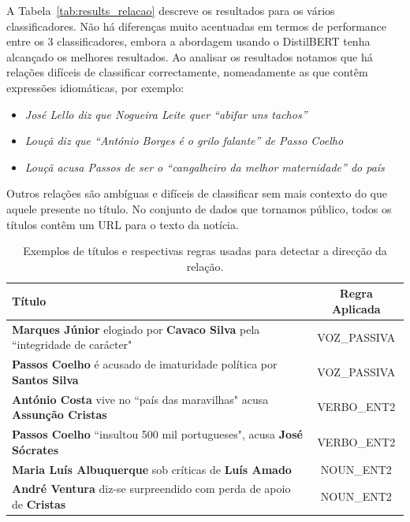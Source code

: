 \documentclass[a4paper, twocolumn, 11pt, twoside]{article}
\begin{document}
A Tabela~\ref{tab:results_relacao} descreve os resultados para os vários classificadores. Não há diferenças muito acentuadas em termos de performance entre os 3 classificadores, embora a abordagem usando o DistilBERT tenha alcançado os melhores resultados. Ao analisar os resultados notamos que há relações difíceis de classificar correctamente, nomeadamente as que contêm expressões idiomáticas, por exemplo:

\begin{itemize}
\item{\textit{José Lello diz que Nogueira Leite quer “abifar uns tachos”}}
\item{\textit{Louçã diz que “António Borges é o grilo falante” de Passo Coelho}}
\item{\textit{Louçã acusa Passos de ser o “cangalheiro da melhor maternidade” do país}}
\end{itemize}

Outros relações são ambíguas e difíceis de classificar sem mais contexto do que aquele presente no título. No conjunto de dados que tornamos público, todos os títulos contêm um URL para o texto da notícia.

\begin{table}
  \centering
  \begin{tabular}{lc}
      {\bf Título} & {\bf Regra Aplicada} \\
      \hline
	  \textbf{Marques Júnior} elogiado por \textbf{Cavaco Silva} pela ``integridade de carácter" & VOZ\_PASSIVA \\
	  \textbf{Passos Coelho} é acusado de imaturidade política por \textbf{Santos Silva}  		 & VOZ\_PASSIVA \\
	  \textbf{António Costa} vive no ``país das maravilhas" acusa \textbf{Assunção Cristas}      & VERBO\_ENT2 \\
	  \textbf{Passos Coelho} ``insultou 500 mil portugueses", acusa \textbf{José Sócrates}		 & VERBO\_ENT2 \\ 
	  \textbf{Maria Luís Albuquerque} sob críticas de \textbf{Luís Amado}						 & NOUN\_ENT2 \\
	  \textbf{André Ventura} diz-se surpreendido com perda de apoio de \textbf{Cristas}			 & NOUN\_ENT2 \\

	  \hline
  \end{tabular}
  \caption{Exemplos de títulos e respectivas regras usadas para detectar a direcção da relação.}
  \label{tab:examples_patterns_direction}
\end{table}
\end{document}
